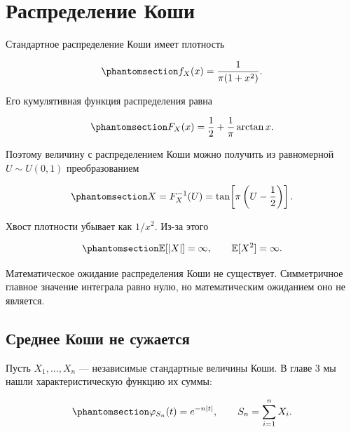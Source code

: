 \documentclass[
  russian,
  11pt,
  a4paper,
  open=any]{scrbook}
\begin{document}
\section{Распределение
Коши}\label{ux440ux430ux441ux43fux440ux435ux434ux435ux43bux435ux43dux438ux435-ux43aux43eux448ux438-1}

Стандартное распределение Коши имеет плотность

\begin{equation}\protect\phantomsection\label{eq-ch5-cauchy-density}{
f_X(x)=\frac{1}{\pi(1+x^2)}.
}\end{equation}

Его кумулятивная функция распределения равна

\begin{equation}\protect\phantomsection\label{eq-ch5-cauchy-cdf}{
F_X(x)=\frac12+\frac1\pi\arctan x.
}\end{equation}

Поэтому величину с распределением Коши можно получить из равномерной
\(U\sim U(0,1)\) преобразованием

\begin{equation}\protect\phantomsection\label{eq-ch5-cauchy-inverse-transform}{
X=F_X^{-1}(U)
=\tan\!\left[\pi\left(U-\frac12\right)\right].
}\end{equation}

Хвост плотности убывает как \(1/x^2\). Из-за этого

\begin{equation}\protect\phantomsection\label{eq-ch5-cauchy-divergent-moments}{
\mathbb E[|X|]=\infty,
\qquad
\mathbb E[X^2]=\infty.
}\end{equation}

Математическое ожидание распределения Коши не существует. Симметричное
главное значение интеграла равно нулю, но математическим ожиданием оно
не является.

\subsection{Среднее Коши не сужается}\label{interactive-cauchy-mean}

Пусть \(X_1,\ldots,X_n\) --- независимые стандартные величины Коши. В
главе 3 мы нашли характеристическую функцию их суммы:

\begin{equation}\protect\phantomsection\label{eq-ch5-cauchy-sum-characteristic}{
\varphi_{S_n}(t)=e^{-n|t|},
\qquad
S_n=\sum_{i=1}^{n}X_i.
}\end{equation}
\end{document}
